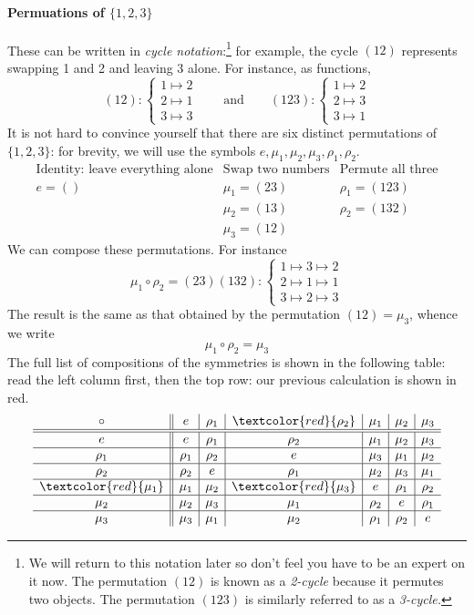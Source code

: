 \paragraph{Permuations of $\{1,2,3\}$} These can be written in \emph{cycle notation}:\footnote{We will return to this notation later so don't feel you have to be an expert on it now. The permutation $(12)$ is known as a \emph{2-cycle} because it permutes two objects. The permutation $(123)$ is similarly referred to as a \emph{3-cycle.}} for example, the cycle $(12)$ represents swapping 1 and 2 and leaving 3 alone. For instance, as functions,
\[(12):\begin{cases}
1\mapsto 2\\
2\mapsto 1\\
3\mapsto 3
\end{cases}\qquad\text{and}\qquad
(123):\begin{cases}
1\mapsto 2\\
2\mapsto 3\\
3\mapsto 1
\end{cases}\]
It is not hard to convince yourself that there are six distinct permutations of $\{1,2,3\}$: for brevity, we will use the symbols $e,\mu_1,\mu_2,\mu_3,\rho_1,\rho_2$.
\[\begin{array}{c|c|c}
\text{Identity: leave everything alone} & \text{Swap two numbers} & \text{Permute all three}\\\hline
e=() & \mu_1=(23) & \rho_1=(123)\\
& \mu_2=(13) & \rho_2=(132)\\
& \mu_3=(12) &
\end{array}\]
We can compose these permutations. For instance
\[\mu_1\circ\rho_2=(23)(132):\begin{cases}
1\mapsto 3\mapsto 2\\
2\mapsto 1\mapsto 1\\
3\mapsto 2\mapsto 3
\end{cases}\]
The result is the same as that obtained by the permutation $(12)=\mu_3$, whence we write
\[\mu_1\circ\rho_2=\mu_3\]
The full list of compositions of the symmetries is shown in the following table: read the left column first, then the top row: our previous calculation is shown in red.\label{intro:table}
\[\begin{array}{c||c|c|c|c|c|c}
\circ & e & \rho_1 & \textcolor{red}{\rho_2} & \mu_1 & \mu_2 & \mu_3\\
 \hline\hline
e & e & \rho_1 & \rho_2 & \mu_1 & \mu_2 & \mu_3\\
\hline
\rho_1 & \rho_1 & \rho_2 & e & \mu_3 & \mu_1 & \mu_2\\
\hline
\rho_2 & \rho_2 & e & \rho_1 & \mu_2 & \mu_3 & \mu_1\\
\hline
\textcolor{red}{\mu_1} & \mu_1 & \mu_2 & \textcolor{red}{\mu_3} & e & \rho_1 & \rho_2\\
\hline
\mu_2 & \mu_2 & \mu_3 & \mu_1 & \rho_2 & e & \rho_1\\
\hline
\mu_3 & \mu_3 & \mu_1 & \mu_2 & \rho_1 & \rho_2 & e
\end{array}\]


